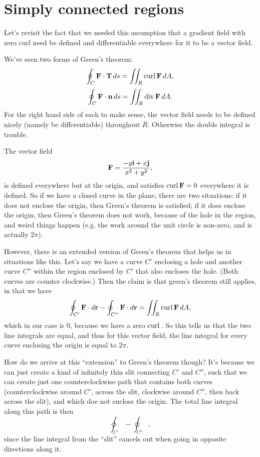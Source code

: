 \section{Simply connected regions}

Let's revisit the fact that we needed this assumption that a gradient field with zero curl need be defined and differentiable everywhere for it to be a vector field.

We've seen two forms of Green's theorem:
\[ \oint_C \boldsymbol{\mathbf{F}} \cdot \boldsymbol{\mathbf{T}} \, ds = \iint_R \mathrm{curl}\, \boldsymbol{\mathbf{F}} \, dA, \]
\[ \oint_C \boldsymbol{\mathbf{F}} \cdot \boldsymbol{\mathbf{n}} \, ds = \iint_R \mathrm{div}\, \boldsymbol{\mathbf{F}} \, dA. \]
For the right hand side of each to make sense, the vector field needs to be defined nicely (namely be differentiable) throughout $R$. Otherwise the double integral is trouble. 

\bex
The vector field
\[ \boldsymbol{\mathbf{F}} = \frac{-y\boldsymbol{\mathbf{i}} + x \boldsymbol{\mathbf{j}}}{x^2+y^2}, \]
is defined everywhere but at the origin, and satisfies $\mathrm{curl}\, \boldsymbol{\mathbf{F}} = 0$ everywhere it is defined. So if we have a closed curve in the plane, there are two situations: if it does not enclose the origin, then Green's theorem is satisfied; if it does enclose the origin, then Green's theorem does not work, because of the hole in the region, and weird things happen (e.g. the work around the unit circle is non-zero, and is actually $2\pi$). 

However, there is an extended version of Green's theorem that helps us in situations like this. Let's say we have a curve $C'$ enclosing a hole and another curve $C''$ within the region enclosed by $C'$ that also encloses the hole. (Both curves are counter clockwise.) Then the claim is that green's theorem still applies, in that we have
\[ \oint_{C'} \boldsymbol{\mathbf{F}} \cdot d\boldsymbol{\mathbf{r}} - \oint_{C''} \boldsymbol{\mathbf{F}} \cdot d\boldsymbol{\mathbf{r}} = \iint_R \mathrm{curl}\,{\boldsymbol{\mathbf{F}}}\,dA, \]
which in our case is 0, because we have a zero $\mathrm{curl}\,$. So this tells us that the two line integrals are equal, and thus for this vector field, the line integral for every curve enclosing the origin is equal to $2 \pi$.
\eex

How do we arrive at this ``extension'' to Green's theorem though? It's because we can just create a kind of infinitely thin slit connecting $C'$ and $C''$, such that we can create just one counterclockwise path that contains both curves (counterclockwise around $C'$, across the slit, clockwise around $C''$, then back across the slit), and which doe not enclose the origin. The total line integral along this path is then
\[ \oint_{C'} - \oint_{C''}, \]
since the line integral from the ``slit'' cancels out when going in opposite directions along it.

